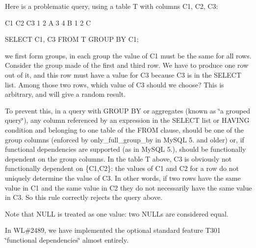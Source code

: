 Here is a problematic query, using a table T with columns C1, C2, C3\+: \begin{DoxyVerb}C1 C2 C3
1  2  A
3  4  B
1  2  C

SELECT C1, C3 FROM T GROUP BY C1;
\end{DoxyVerb}
 we first form groups, in each group the value of C1 must be the same for all rows. Consider the group made of the first and third row. We have to produce one row out of it, and this row must have a value for C3 because C3 is in the S\+E\+L\+E\+CT list. Among those two rows, which value of C3 should we choose? This is arbitrary, and will give a random result.

To prevent this, in a query with G\+R\+O\+UP BY or aggregates (known as \char`\"{}a grouped
query\char`\"{}), any column referenced by an expression in the S\+E\+L\+E\+CT list or H\+A\+V\+I\+NG condition and belonging to one table of the F\+R\+OM clause, should be one of the group columns (enforced by only\+\_\+full\+\_\+group\+\_\+by in My\+S\+QL 5. and older) or, if functional dependencies are supported (as in My\+S\+QL 5.), should be functionally dependent on the group columns. In the table T above, C3 is obviously not functionally dependent on \{C1,C2\}\+: the values of C1 and C2 for a row do not uniquely determine the value of C3. In other words, if two rows have the same value in C1 and the same value in C2 they do not necessarily have the same value in C3. So this rule correctly rejects the query above.

Note that N\+U\+LL is treated as one value\+: two N\+U\+L\+Ls are considered equal.

In WL\#2489, we have implemented the optional standard feature T301 \char`\"{}functional dependencies\char`\"{} almost entirely.


